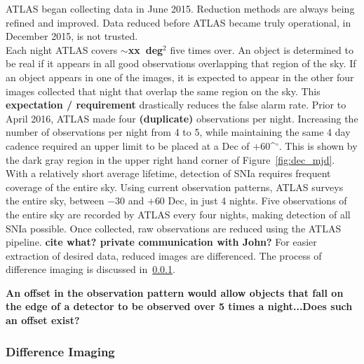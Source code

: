 \documentclass[aps,prb,twocolumn,superscriptaddress]{revtex4-1}
\def\deg{\ifmmode^\circ\else$^\circ$\fi}
\begin{document}
\indent ATLAS began collecting data in June 2015. Reduction methods 
are always being refined and improved. Data reduced before 
ATLAS became truly operational, in December 2015, is not trusted.\\
%
%
\indent Each night ATLAS covers {\bf $\sim$xx~deg$^{2}$} five times over. 
An object is determined to be real if it appears in all good 
observations overlapping that region of the sky. 
If an object appears in one of the images, it is expected to appear 
in the other four images collected that night that overlap the same region on the sky. 
This {\bf expectation / requirement} drastically reduces the false alarm rate. 
%
%
\indent Prior to April 2016, ATLAS made four {\bf (duplicate)} observations per 
night. Increasing the number of observations per night from 4 to 5, 
while maintaining the same 4 day cadence required an upper limit to 
be placed at a Dec of $+60$\deg. This is shown by the dark gray region in 
the upper right hand corner of Figure~\ref{fig:dec_mjd}.
%
%
\indent With a relatively short average lifetime, detection of SNIa requires 
frequent coverage of the entire sky. Using current observation patterns,
ATLAS surveys the entire sky, between $-30$ and $+60$ Dec, in just 4 nights. 
Five observations of the entire sky are recorded by ATLAS every four nights, 
making detection of all SNIa possible.
%
%
\indent Once collected, raw observations are reduced using the ATLAS pipeline. 
{\bf cite what? private communication with John?}
For easier extraction of desired data, reduced images are differenced. 
The process of difference imaging is discussed in~\cref{sec:diffimg}. 


{\bf An offset in the observation pattern would allow objects that fall 
on the edge of a detector to be observed over 5 times a night...Does 
such an offset exist?}



\subsubsection{Difference Imaging}\label{sec:diffimg}

\end{document}
